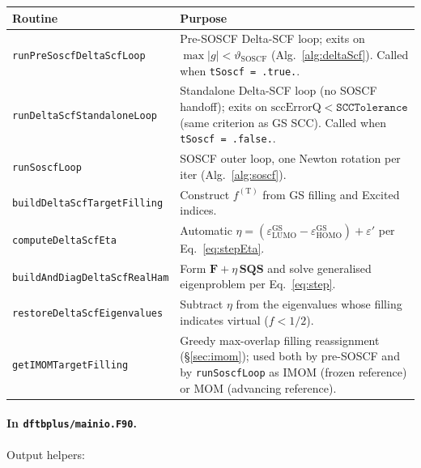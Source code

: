 \documentclass[11pt,a4paper]{article}
\newcommand{\FF}{\mathbf{F}}
\newcommand{\SS}{\mathbf{S}}
\begin{document}
\begin{center}
\begin{tabular}{ll}
\toprule
Routine & Purpose \\
\midrule
\texttt{runPreSoscfDeltaScfLoop} & Pre-SOSCF Delta-SCF loop; exits on $\max|g|<\vartheta_\mathrm{SOSCF}$ (Alg.~\ref{alg:deltaScf}). Called when \texttt{tSoscf = .true.}. \\
\texttt{runDeltaScfStandaloneLoop} & Standalone Delta-SCF loop (no SOSCF handoff); exits on $\mathrm{sccErrorQ}<\mathtt{SCCTolerance}$ (same criterion as GS SCC). Called when \texttt{tSoscf = .false.}. \\
\texttt{runSoscfLoop}    & SOSCF outer loop, one Newton rotation per iter (Alg.~\ref{alg:soscf}). \\
\texttt{buildDeltaScfTargetFilling} & Construct $f^{(\mathrm{T})}$ from GS filling and Excited indices. \\
\texttt{computeDeltaScfEta} & Automatic $\eta = (\varepsilon_\mathrm{LUMO}^\mathrm{GS}-\varepsilon_\mathrm{HOMO}^\mathrm{GS})+\varepsilon'$ per Eq.~\eqref{eq:stepEta}. \\
\texttt{buildAndDiagDeltaScfRealHam} & Form $\FF+\eta\,\SS\mathbf{Q}\SS$ and solve generalised eigenproblem per Eq.~\eqref{eq:step}. \\
\texttt{restoreDeltaScfEigenvalues} & Subtract $\eta$ from the eigenvalues whose filling indicates virtual ($f<1/2$). \\
\texttt{getIMOMTargetFilling} & Greedy max-overlap filling reassignment (\S\ref{sec:imom}); used both by pre-SOSCF and by \texttt{runSoscfLoop} as IMOM (frozen reference) or MOM (advancing reference). \\
\bottomrule
\end{tabular}
\end{center}

\paragraph{In \texttt{dftbplus/mainio.F90}.}
Output helpers:
\end{document}
